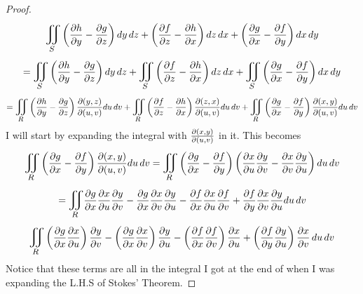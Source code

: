 \documentclass[titlepage]{article}
\begin{document}
\begin{proof}
 $$ \bigiint{S}{} \left( \frac{\p h}{\p y} - \frac{\p g}{\p z} \right)dy\,dz + \left( \frac{\p f}{\p z} - \frac{\p h}{\p x} \right)dz\,dx + \left( \frac{\p g}{\p x} - \frac{\p f}{\p y} \right)dx\,dy $$ 
 $$=\bigiint{S}{} \left( \frac{\p h}{\p y} - \frac{\p g}{\p z} \right)dy\,dz + \bigiint{S}{} \left( \frac{\p f}{\p z} - \frac{\p h}{\p x} \right)dz\,dx +  \bigiint{S}{} \left( \frac{\p g}{\p x} - \frac{\p f}{\p y} \right)dx\,dy$$
$$= \bigiint{R}{} \left( \frac{\p h}{\p y} - \frac{\p g}{\p z} \right)\frac{\p(y,z)}{\p(u,v)}du\,dv + \bigiint{R}{} \left( \frac{\p f}{\p z} - \frac{\p h}{\p x} \right)\frac{\p(z,x)}{\p(u,v)}du\,dv +  \bigiint{R}{} \left( \frac{\p g}{\p x} - \frac{\p f}{\p y} \right)\frac{\p(x,y)}{\p (u,v)}du\,dv$$
I will start by expanding the integral with $\frac{\partial(x,y)}{\partial (u,v)}$ in it. This becomes
$$\bigiint{R}{} \left( \frac{\p g}{\p x} - \frac{\p f}{\p y} \right)\frac{\p(x,y)}{\p (u,v)}du\,dv = \bigiint{R}{} \left( \frac{\p g}{\p x} - \frac{\p f}{\p y} \right)\left(\frac{\p x}{\p u} \frac{\p y}{\p v} - \frac{\p x}{\p v} \frac{\p y}{\p u} \right)du\,dv$$
$$= \bigiint{R}{} \frac{\p g}{\p x} \frac{\p x}{\p u} \frac{\p y}{\p v} -  \frac{\p g}{\p x} \frac{\p x}{\p v} \frac{\p y}{\p u} -  \frac{\p f}{\p x} \frac{\p x}{\p u} \frac{\p f}{\p v} + \frac{\p f}{\p y} \frac{\p x}{\p v} \frac{\p y}{\p u} du\,dv $$
$$ \bigiint{R}{} \left(\frac{\p g}{\p x} \frac{\p x}{\p u}\right) \frac{\p y}{\p v} -  \left(\frac{\p g}{\p x} \frac{\p x}{\p v}\right) \frac{\p y}{\p u} -  \left(\frac{\p f}{\p x} \frac{\p f}{\p v}\right)\frac{\p x}{\p u} + \left( \frac{\p f}{\p y}  \frac{\p y}{\p u}\right)\frac{\p x}{\p v}\,du\,dv$$
Notice that these terms are all in the integral I got at the end of when I was expanding the L.H.S of Stokes' Theorem. %

\end{proof}
\end{document}
